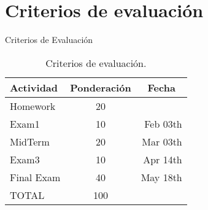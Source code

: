 \section{Criterios de evaluación}
\begin{frame}{Criterios de Evaluación}
  
  \begin{table}[h]
    \centering
    \begin{tabular}{lcr}
      \toprule[2pt]
      \textbf{Actividad} & \textbf{Ponderación} & \multicolumn{1}{c}{\textbf{Fecha}}\\ \midrule
      Homework & 20 & \\
      Exam1 & 10 & Feb 03th  \\
      MidTerm & 20 & Mar 03th   \\
      Exam3 & 10 & Apr 14th   \\
      Final Exam & 40 & May 18th   \\
      \midrule
      TOTAL & 100 \\ \bottomrule[1.5pt]
    \end{tabular}
    \caption{Criterios de evaluación.}
    \label{tab:criteriosEvaluacion}
  \end{table}
\end{frame}


\begin{comment}
  
\begin{frame}
  \frametitle{Lineamientos}
  \begin{itemize} \justifying \parskip3mm

  \item<only@1> 15 a 30 minutos retardo, después de este tiempo se considera falta.
      \item<only@1> Si llegan tarde, por favor entrar en silencio.
      \item<only@1> Retardos, se colocan al final de la clase.
      \item<only@1> Respeto, actitud, evitar groserías.
      \item<only@1> Copiar exámenes o tareas anula calificación  correspondiente.
      \item<only@2> Examenes se aplican \alert{solo en fecha y hora establecida}.
      \item<only@2>  Pueden  \alert{tomar alimentos muy ligeros y sin olores fuertes} dentro del salón de clase,
      \item<only@2> Encender equipos al llegar
  \end{itemize}
\end{frame}
\end{comment}





